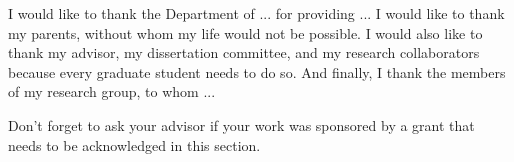 I would like to thank the Department of ... for providing ... I would like to thank my parents, without whom my life would not be possible. I would also like to thank my advisor, my dissertation committee, and my research collaborators because every graduate student needs to do so. And finally, I thank the members of my research group, to whom ...  

Don't forget to ask your advisor if your work was sponsored by a grant that needs to be acknowledged in this section.  

